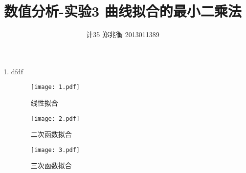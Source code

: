 \documentclass[UTF8]{ctexart}
\author{计35 郑兆衡 2013011389}
\title{数值分析-实验3 曲线拟合的最小二乘法}
\begin{document}
 
  \maketitle 
  \begin{enumerate}
    \begin{enumerate}[$<$1$>$]
    	\item dfdf
  		\begin{figure}[H]
  			\centering\texttt{[image: 1.pdf]} 
  			\caption{线性拟合}\label{fig:1} 
  		\end{figure} 

      \begin{figure}[H]
        \centering\texttt{[image: 2.pdf]} 
        \caption{二次函数拟合}\label{fig:2} 
      \end{figure}

      \begin{figure}[H]
        \centering\texttt{[image: 3.pdf]} 
        \caption{三次函数拟合}\label{fig:3} 
      \end{figure} 
    \end{enumerate}
  \end{enumerate}
\end{document}

